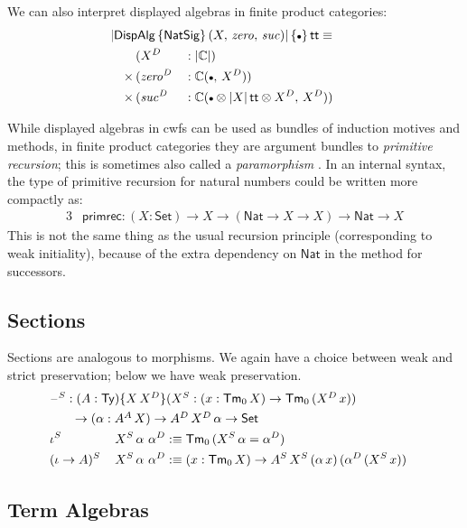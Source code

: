 \documentclass[12pt,a4paper,twoside,openany]{book}
\theoremstyle{remark}
\theoremstyle{definition}
\theoremstyle{theorem}
\newcommand{\mi}[1]{\mathit{#1}}
\newcommand{\ms}[1]{\mathsf{#1}}
\newcommand{\mbb}[1]{\mathbb{#1}}
\newcommand{\Tm}{\mathsf{Tm}}
\newcommand{\Ty}{\mathsf{Ty}}
\renewcommand{\tt}{\mathsf{tt}}
\newcommand{\blank}{\mathord{\hspace{1pt}\text{--}\hspace{1pt}}}
\newcommand{\Set}{\mathsf{Set}}
\newcommand{\emptycon}{\scaleobj{.75}\bullet}
\newcommand{\DispAlg}{\ms{DispAlg}}
\newcommand{\Nat}{\ms{Nat}}
\newcommand{\mbbC}{\mbb{C}}
\newcommand{\defn}{:\equiv}
\begin{document}
We can also interpret displayed algebras in finite product categories:
\begin{alignat*}{3}
  & \hspace{-2em}\rlap{$|\DispAlg\,\{\ms{NatSig}\}\,(X,\,\mi{zero},\,\mi{suc})|\,\{\emptycon\}\,\tt \equiv$}\\
              & (X^D &&: |\mbbC|)\\
      \times\,& (\mi{zero^D} &&: \mbbC(\emptycon,\,X^D))\\
      \times\,& (\mi{suc^D} &&: \mbbC(\emptycon \otimes |X|\,\tt \otimes X^D,\, X^D))
\end{alignat*}

While displayed algebras in cwfs can be used as bundles of induction motives and
methods, in finite product categories they are argument bundles to
\emph{primitive recursion}; this is sometimes also called a
\emph{paramorphism} \cite{bananas}. In an internal syntax, the type of primitive
recursion for natural numbers could be written more compactly as:
\begin{alignat*}{3}
  & \ms{primrec} : (X : \Set) \to X \to (\Nat \to X \to X) \to \Nat \to X
\end{alignat*}
This is not the same thing as the usual recursion principle (corresponding to
weak initiality), because of the extra dependency on $\Nat$ in the method for
successors.

\subsection{Sections}
Sections are analogous to morphisms. We again have a choice between weak and
strict preservation; below we have weak preservation.
\begin{alignat*}{3}
  & \rlap{$\blank^S : (A : \Ty)\{X\,X^D\}(X^S : (x : \Tm_0\,X)\to \Tm_0\,(X^D\,x))$}\\
  & \hspace{2em}\rlap{$\to (\alpha : A^A\,X) \to A^D\,X^D\,\alpha \to \Set$}\\
  & \iota^S\,&&X^S\,\alpha\,\,\alpha^D \defn \Tm_0\,(X^S\,\alpha = \alpha^D) \\
  & (\iota\to A)^S\,&&X^S\,\alpha\,\,\alpha^D \defn
  (x : \Tm_0\,X) \to A^S\,X^S\,(\alpha\,x)\,(\alpha^D\,(X^S\,x))
\end{alignat*}

\subsection{Term Algebras}
\end{document}
